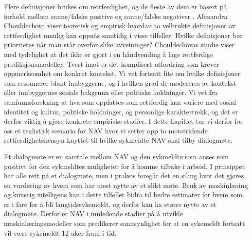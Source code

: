 \documentclass[
]{book}
\begin{document}
Flere definisjoner brukes om rettferdighet, og de fleste av dem er basert på forhold mellom sanne/falske positive og sanne/falske negativer \citep{verma2018fairness}.
Alexandra Chouldechova \citeyearpar{chouldechova2018case} viser teoretisk og empirisk hvordan to velbrukte definisjoner av rettferdighet umulig kan oppnås samtidig i visse tilfeller.
Hvilke definisjoner bør prioriteres når man står overfor slike avveininger?
Chouldechovas studie viser med tydelighet at det ikke er gjort i en håndvending å lage rettferdige prediksjonsmodeller.
Tvert imot er det komplisert utfordring som krever oppmerksomhet om konkret kontekst.
Vi vet fortsatt lite om hvilke definisjoner som resonnerer blant innbyggerne, og i hvilken grad de modereres av kontekst eller innbyggernes sosiale bakgrunn eller politiske holdninger.
Vi vet fra samfunnsforskning at hva som oppfattes som rettferdig kan variere med sosial identitet og kultur, politiske holdninger, og personlige karaktertrekk, og det er derfor viktig å gjøre konkrete empiriske studier.
I dette kapitlet tar vi derfor for oss et realistisk scenario for NAV hvor vi setter opp to motstridende rettferdighetshensyn knyttet til hvilke sykmeldte NAV skal tilby dialogmøte.

Et dialogmøte er en samtale mellom NAV og den sykmeldte som anses som positivt for den sykmeldtes muligheter for å komme tilbake i arbeid.
I prinsippet har alle rett på et dialogmøte, men i praksis foregår det en siling hvor det gjøres en vurdering av hvem som har mest nytte av et slikt møte.
Bruk av maskinlæring og kunstig intelligens kan i dette tilfellet bidra til bedre estimater for hvem som er i fare for å bli langtidssykemeldt, og derfor kan ha større nytte av et dialogmøte.
Derfor er NAV i innledende stadier på å utvikle maskinlæringsmodeller som predikerer sannsynlighet for at en sykemeldt fortsatt vil være sykemeldt 12 uker fram i tid.
\end{document}
